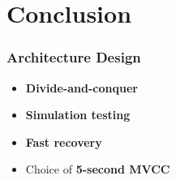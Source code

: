 \section{Conclusion}

\begin{frame}
    \frametitle{Architecture Design}
    \begin{itemize}
        \item \textbf{Divide-and-conquer}
        \item \textbf{Simulation testing}
        \item \textbf{Fast recovery}
        \item Choice of \textbf{5-second MVCC}
    \end{itemize}
\end{frame}

